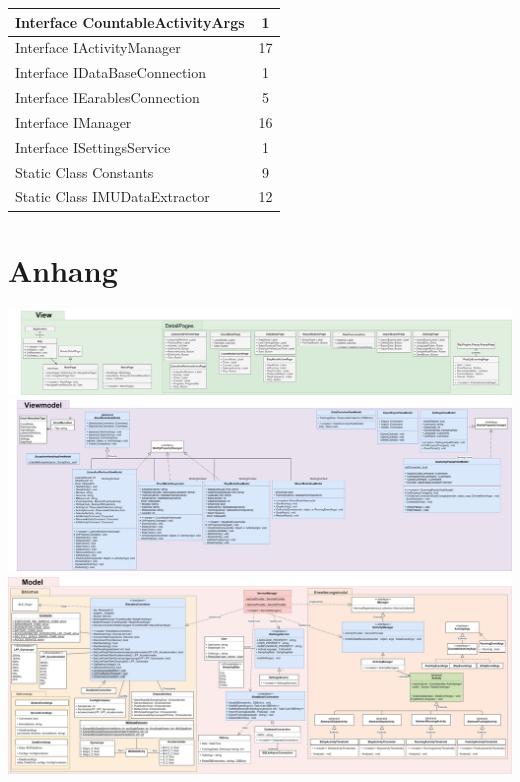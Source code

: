 \documentclass[a4paper,12pt]{article}
\begin{document}
\begin{center}
\begin{longtable}{|p{14cm}|c|}
\hline
Interface CountableActivityArgs & 1\\
\hline
Interface IActivityManager & 17\\
\hline
Interface IDataBaseConnection & 1\\
\hline
Interface IEarablesConnection & 5\\
\hline
Interface IManager & 16\\
\hline
Interface ISettingsService & 1\\
\hline
Static Class Constants & 9\\
\hline
Static Class IMUDataExtractor & 12\\
\hline
\end{longtable}
\end{center}


\section{Anhang}
\begin{center}
\includegraphics[width=1.5\textwidth, angle=-90]{./bilder/Anhang/View.png}\\
\includegraphics[width=1.5\textwidth, angle=-90]{./bilder/Anhang/Viewmodel.png}\\
\includegraphics[width=1.5\textwidth, angle=-90]{./bilder/Anhang/Model.png}\\
\end{center}

\clearpage

\printglossaries
{}
\end{document}
